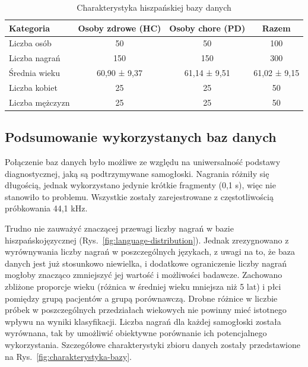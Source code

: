 \begin{table}[ht]
\centering
\caption{Charakterystyka hiszpańskiej bazy danych}
\label{tab:spanish-database}
\begin{tabular}{|l|c|c|c|}
\hline
\textbf{Kategoria} &\textbf{Osoby zdrowe (HC)} &\textbf{Osoby chore (PD)} &\textbf{Razem} \\ \hline
Liczba osób &50 &50 &100\\ \hline
Liczba nagrań &150 &150 &300\\ \hline
Średnia wieku &60,90 ± 9,37 &61,14 ± 9,51  &61,02 ± 9,15\\ \hline
Liczba kobiet &25 &25 &50\\ \hline
Liczba mężczyzn &25 &25 &50 \\ \hline
\end{tabular}
\end{table}

\subsection{Podsumowanie wykorzystanych baz danych}
\label{subsec:podsumowanie-baz}

Połączenie baz danych było możliwe ze względu na uniwersalność podstawy diagnostycznej, jaką są podtrzymywane samogłoski.
Nagrania różniły się długością, jednak wykorzystano jedynie krótkie fragmenty (0,1 s), więc nie stanowiło to problemu.
Wszystkie zostały zarejestrowane z częstotliwością próbkowania 44,1 kHz.

Trudno nie zauważyć znaczącej przewagi liczby nagrań w bazie hiszpańskojęzycznej (Rys.~\ref{fig:language-distribution}).
Jednak zrezygnowano z wyrównywania liczby nagrań w poszczególnych językach, z uwagi na to, że baza danych jest już stosunkowo niewielka, i dodatkowe ograniczenie liczby nagrań mogłoby znacząco zmniejszyć jej wartość i możliwości badawcze.
Zachowano zbliżone proporcje wieku (różnica w średniej wieku mniejsza niż 5 lat) i płci pomiędzy grupą pacjentów a grupą porównawczą.
Drobne różnice w liczbie próbek w poszczególnych przedziałach wiekowych nie powinny mieć istotnego wpływu na wyniki klasyfikacji.
Liczba nagrań dla każdej samogłoski została wyrównana, tak by umożliwić obiektywne porównanie ich potencjalnego wykorzystania.
Szczegółowe charakterystyki zbioru danych zostały przedstawione na Rys.~\ref{fig:charakterystyka-bazy}.


